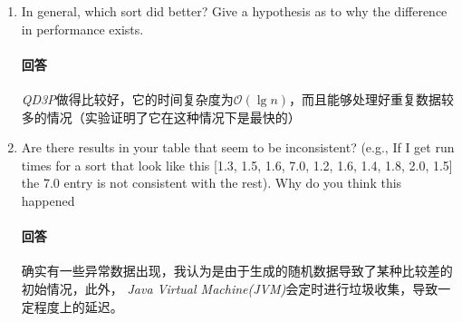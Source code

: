 \documentclass[12pt,a4paper]{ctexart}
\begin{document}
\begin{enumerate}
    \item In general, which sort did better? Give a hypothesis as to why the difference in performance exists.

          \paragraph{回答}
          \textit{QD3P}做得比较好，它的时间复杂度为$\mathcal{O}(\lg{n})$，而且能够处理好重复数据较多的情况（实验证明了它在这种情况下是最快的）

    \item Are there results in your table that seem to be inconsistent? (e.g., If I get run times for a sort that look like
          this [1.3, 1.5, 1.6, 7.0, 1.2, 1.6, 1.4, 1.8, 2.0, 1.5] the 7.0 entry is not consistent with the rest). Why do you think
          this happened

          \paragraph{回答} 确实有一些异常数据出现，我认为是由于生成的随机数据导致了某种比较差的初始情况，此外，
          \textit{Java Virtual Machine(JVM)}会定时进行垃圾收集，导致一定程度上的延迟。

\end{enumerate}
\end{document}
